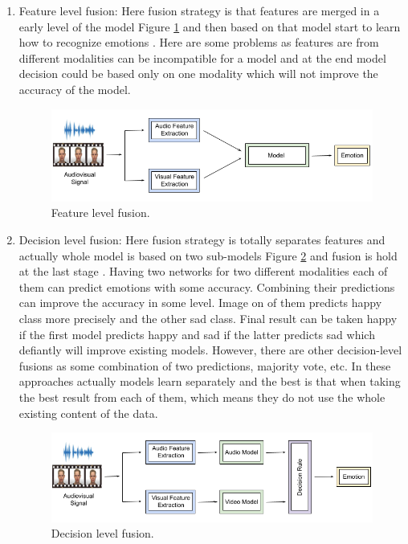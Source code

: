 \documentclass[oneside]{report}
\begin{document}
    \begin{enumerate}
        \item Feature level fusion: Here fusion strategy is that features are merged in a early level of the model Figure \ref{fig:flf} and then based on that model start to learn how to recognize emotions \cite{feature_fusion1, feature_fusion2, feature_fusion3}. Here are some problems as features are from different modalities can be incompatible for a model and at the end model decision could be based only on one modality which will not improve the accuracy of the model.
        
        \begin{figure}[H]
        \centering
        \includegraphics[scale=0.6]{flf.png}
        \caption{Feature level fusion.}
        \label{fig:flf}
        \end{figure}
        
        \item Decision level fusion: Here fusion strategy is totally separates features and actually whole model is based on two sub-models Figure \ref{fig:dlf} and fusion is hold at the last stage \cite{india_2020, slovenia_2014}. Having two networks for two different modalities each of them can predict emotions with some accuracy. Combining their predictions can improve the accuracy in some level. Image on of them predicts happy class more precisely and the other sad class. Final result can be taken happy if the first model predicts happy and sad if the latter predicts sad which defiantly will improve existing models. However, there are other decision-level fusions as some combination of two predictions, majority vote, etc. In these approaches actually models learn separately and the best is that when taking the best result from each of them, which means they do not use the whole existing content of the data. 
        
        
        \begin{figure}[H]
        \centering
        \includegraphics[scale=0.6]{dlf.png}
        \caption{Decision level fusion.}
        \label{fig:dlf}
        \end{figure}
        

\end{enumerate}
\end{document}
